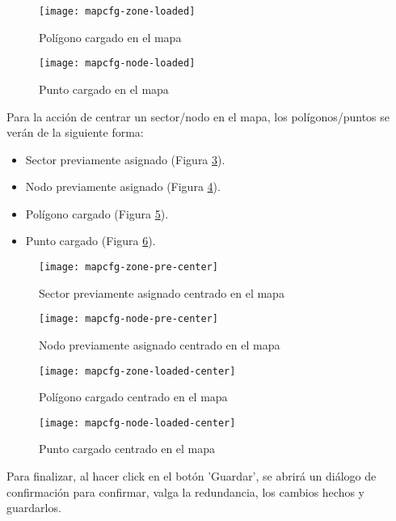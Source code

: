 \begin{figure}[H]
	\centering
	\texttt{[image: mapcfg-zone-loaded]}
	\caption{\label{fig:mapcfg-zone-loaded} Polígono cargado en el mapa}
\end{figure}

\begin{figure}[H]
	\centering
	\texttt{[image: mapcfg-node-loaded]}
	\caption{\label{fig:mapcfg-node-loaded} Punto cargado en el mapa}
\end{figure}

Para la acción de centrar un sector/nodo en el mapa, los polígonos/puntos se verán de la siguiente forma:
\begin{itemize}
    \item Sector previamente asignado (Figura \ref{fig:mapcfg-zone-pre-center}).
    \item Nodo previamente asignado (Figura \ref{fig:mapcfg-node-pre-center}).
    \item Polígono cargado (Figura \ref{fig:mapcfg-zone-loaded-center}).
    \item Punto cargado (Figura \ref{fig:mapcfg-node-loaded-center}).
\end{itemize}

\begin{figure}[H]
	\centering
	\texttt{[image: mapcfg-zone-pre-center]}
	\caption{\label{fig:mapcfg-zone-pre-center} Sector previamente asignado centrado en el mapa}
\end{figure}

\begin{figure}[H]
	\centering
	\texttt{[image: mapcfg-node-pre-center]}
	\caption{\label{fig:mapcfg-node-pre-center} Nodo previamente asignado centrado en el mapa}
\end{figure}

\begin{figure}[H]
	\centering
	\texttt{[image: mapcfg-zone-loaded-center]}
	\caption{\label{fig:mapcfg-zone-loaded-center} Polígono cargado centrado en el mapa}
\end{figure}

\begin{figure}[H]
	\centering
	\texttt{[image: mapcfg-node-loaded-center]}
	\caption{\label{fig:mapcfg-node-loaded-center} Punto cargado centrado en el mapa}
\end{figure}

Para finalizar, al hacer click en el botón 'Guardar', se abrirá un diálogo de confirmación para confirmar, valga la redundancia, los cambios hechos y guardarlos.

